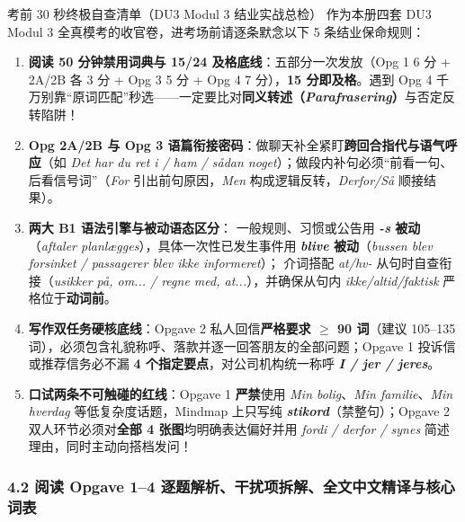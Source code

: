 \begin{tipbox}{考前 30 秒终极自查清单（DU3 Modul 3 结业实战总检）}
作为本册四套 DU3 Modul 3 全真模考的收官卷，进考场前请逐条默念以下 5 条结业保命规则：
\begin{enumerate}
  \item \textbf{阅读 50 分钟禁用词典与 15/24 及格底线}：五部分一次发放（Opg 1 6 分 + 2A/2B 各 3 分 + Opg 3 5 分 + Opg 4 7 分），\textbf{15 分即及格}。遇到 Opg 4 千万别靠“原词匹配”秒选——一定要比对\textbf{同义转述（\textit{Parafrasering}）}与否定反转陷阱！
  \item \textbf{Opg 2A/2B 与 Opg 3 语篇衔接密码}：做聊天补全紧盯\textbf{跨回合指代与语气呼应}（如 \textit{Det har du ret i / ham / sådan noget}）；做段内补句必须“前看一句、后看信号词”（\textit{For} 引出前句原因，\textit{Men} 构成逻辑反转，\textit{Derfor/Så} 顺接结果）。
  \item \textbf{两大 B1 语法引擎与被动语态区分}： 一般规则、习惯或公告用 \textbf{\textit{-s} 被动}（\textit{aftaler planlægges}），具体一次性已发生事件用 \textbf{\textit{blive} 被动}（\textit{bussen blev forsinket / passagerer blev ikke informeret}）； 介词搭配 \textit{at/hv-} 从句时自查衔接（\textit{usikker på, om... / regne med, at...}），并确保从句内 \textit{ikke/altid/faktisk} 严格位于\textbf{动词前}。
  \item \textbf{写作双任务硬核底线}：Opgave 2 私人回信\textbf{严格要求 $\ge$ 90 词}（建议 105--135 词），必须包含礼貌称呼、落款并逐一回答朋友的全部问题；Opgave 1 投诉信或推荐信务必不漏 \textbf{4 个指定要点}，对公司机构统一称呼 \textbf{\textit{I / jer / jeres}}。
  \item \textbf{口试两条不可触碰的红线}：Opgave 1 \textbf{严禁}使用 \textit{Min bolig}、\textit{Min familie}、\textit{Min hverdag} 等低复杂度话题，Mindmap 上只写纯 \textbf{\textit{stikord}}（禁整句）；Opgave 2 双人环节必须对\textbf{全部 4 张图}均明确表达偏好并用 \textit{fordi / derfor / synes} 简述理由，同时主动向搭档发问！
\end{enumerate}
\end{tipbox}

\subsubsection*{4.2 阅读 Opgave 1--4 逐题解析、干扰项拆解、全文中文精译与核心词表}

